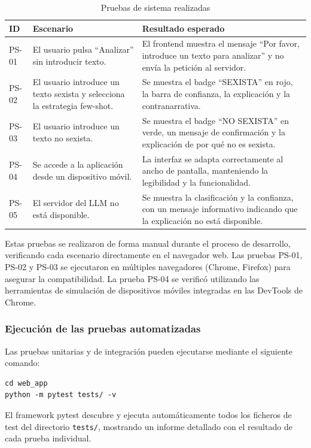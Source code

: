 \begin{table}[H]
\centering
\caption{Pruebas de sistema realizadas}
\label{tab:pruebas-sistema}
\begin{tabular}{|l|p{5cm}|p{5cm}|}
\hline
\textbf{ID} & \textbf{Escenario} & \textbf{Resultado esperado} \\ \hline

PS-01 & El usuario pulsa ``Analizar'' sin introducir texto. & El frontend muestra el mensaje ``Por favor, introduce un texto para analizar'' y no envía la petición al servidor. \\ \hline

PS-02 & El usuario introduce un texto sexista y selecciona la estrategia few-shot. & Se muestra el badge ``SEXISTA'' en rojo, la barra de confianza, la explicación y la contranarrativa. \\ \hline

PS-03 & El usuario introduce un texto no sexista. & Se muestra el badge ``NO SEXISTA'' en verde, un mensaje de confirmación y la explicación de por qué no es sexista. \\ \hline

PS-04 & Se accede a la aplicación desde un dispositivo móvil. & La interfaz se adapta correctamente al ancho de pantalla, manteniendo la legibilidad y la funcionalidad. \\ \hline

PS-05 & El servidor del LLM no está disponible. & Se muestra la clasificación y la confianza, con un mensaje informativo indicando que la explicación no está disponible. \\ \hline

\end{tabular}
\end{table}

Estas pruebas se realizaron de forma manual durante el proceso de desarrollo, verificando cada escenario directamente en el navegador web. Las pruebas PS-01, PS-02 y PS-03 se ejecutaron en múltiples navegadores (Chrome, Firefox) para asegurar la compatibilidad. La prueba PS-04 se verificó utilizando las herramientas de simulación de dispositivos móviles integradas en las DevTools de Chrome.

\subsubsection{Ejecución de las pruebas automatizadas}

Las pruebas unitarias y de integración pueden ejecutarse mediante el siguiente comando:

\begin{verbatim}
cd web_app
python -m pytest tests/ -v
\end{verbatim}

El framework pytest descubre y ejecuta automáticamente todos los ficheros de test del directorio \texttt{tests/}, mostrando un informe detallado con el resultado de cada prueba individual.
